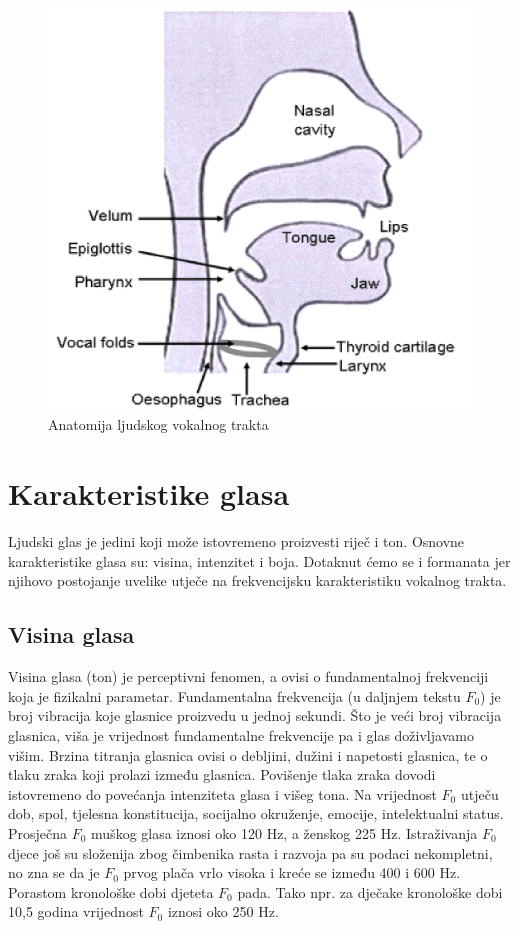 \documentclass[times, utf8, diplomski]{fer}
\begin{document}
\begin{figure}[hbt!]
 \centering
 \includegraphics[scale=0.5]{photos/vokalnitrakt.jpg}
 \caption{Anatomija ljudskog vokalnog trakta}
 \label{trakt}
\end{figure}

\section{Karakteristike glasa}
Ljudski glas je jedini koji može istovremeno proizvesti riječ i ton. Osnovne karakteristike glasa su: visina, intenzitet i boja. Dotaknut ćemo se i formanata jer njihovo postojanje uvelike utječe na frekvencijsku karakteristiku vokalnog trakta. 

\subsection{Visina glasa}
Visina glasa (ton) je perceptivni fenomen, a ovisi o fundamentalnoj frekvenciji koja je fizikalni parametar. Fundamentalna frekvencija (u daljnjem tekstu $F_{0}$) je broj vibracija koje glasnice proizvedu u jednoj sekundi. Što je veći broj vibracija glasnica, viša je vrijednost fundamentalne frekvencije pa i glas doživljavamo višim. Brzina titranja glasnica ovisi o debljini, dužini i napetosti glasnica, te o tlaku zraka koji prolazi između glasnica. Povišenje tlaka zraka dovodi istovremeno do povećanja intenziteta glasa i višeg tona. Na vrijednost $F_{0}$ utječu dob, spol, tjelesna konstitucija, socijalno okruženje, emocije, intelektualni status. Prosječna $F_{0}$ muškog glasa iznosi oko 120 Hz, a ženskog 225 Hz. Istraživanja $F_{0}$ djece još su složenija zbog čimbenika rasta i razvoja pa su podaci nekompletni, no zna se da je $F_{0}$ prvog plača vrlo visoka i kreće se između 400 i 600 Hz. Porastom kronološke dobi djeteta $F_{0}$ pada. Tako npr. za dječake kronološke dobi 10,5 godina vrijednost $F_{0}$ iznosi oko 250 Hz.
\end{document}
